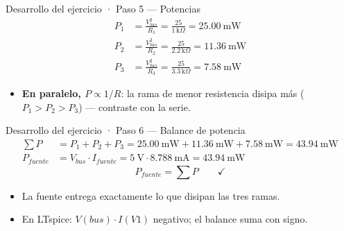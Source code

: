 \documentclass[aspectratio=169]{beamer}
\begin{document}
\begin{frame}{Desarrollo del ejercicio · Paso 5 — Potencias}
  \begin{align*}
    P_1 &= \frac{V_{bus}^2}{R_1} = \frac{25}{1\,\text{k}\Omega} = \SI{25.00}{\milli\watt}\\[2pt]
    P_2 &= \frac{V_{bus}^2}{R_2} = \frac{25}{2.2\,\text{k}\Omega} = \SI{11.36}{\milli\watt}\\[2pt]
    P_3 &= \frac{V_{bus}^2}{R_3} = \frac{25}{3.3\,\text{k}\Omega} = \SI{7.58}{\milli\watt}
  \end{align*}
  \pause
  \begin{itemize}
    \item \textbf{En paralelo, $P \propto 1/R$}: la rama de menor resistencia
      disipa más ($P_1 > P_2 > P_3$) — contraste con la serie.
  \end{itemize}
\end{frame}

\begin{frame}{Desarrollo del ejercicio · Paso 6 — Balance de potencia}
  \begin{align*}
    \sum P &= P_1 + P_2 + P_3
             = \SI{25.00}{\milli\watt} + \SI{11.36}{\milli\watt} + \SI{7.58}{\milli\watt}
             = \SI{43.94}{\milli\watt}\\[4pt]
    P_{fuente} &= V_{bus}\cdot I_{fuente}
                 = \SI{5}{\volt}\cdot \SI{8.788}{\milli\ampere}
                 = \SI{43.94}{\milli\watt}
  \end{align*}
  \[
    \boxed{\;P_{fuente} = \sum P \qquad\checkmark\;}
  \]
  \pause
  \begin{itemize}
    \item La fuente entrega exactamente lo que disipan las tres ramas.
    \item En LTspice: $V(bus)\cdot I(V1)$ negativo; el balance suma con signo.
  \end{itemize}
\end{frame}
\end{document}

